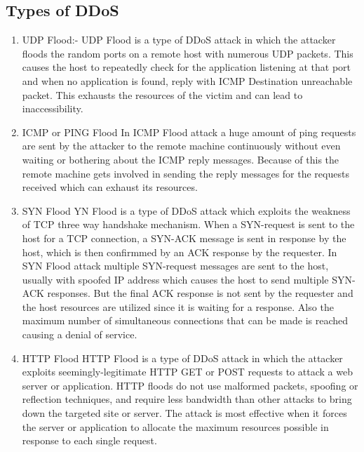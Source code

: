 \documentclass[12pt,a4paper,final]{report}
\begin{document}
\subsection{Types of DDoS}
\begin{enumerate}
\item
UDP Flood:-
\newline
UDP Flood is a type of DDoS attack in which the attacker floods the random ports on a remote host with numerous UDP packets. This causes the host to repeatedly check for the application listening at that port and when no application is found, reply with ICMP 	Destination unreachable packet. This exhausts the resources of the victim and can lead to inaccessibility.

\item
ICMP or PING Flood
\newline
In ICMP Flood attack a huge amount of ping requests are sent by the attacker to the remote machine continuously without even waiting or bothering about the ICMP reply messages. Because of this the remote machine gets involved in sending the reply messages for the requests received which can exhaust its resources. 

\item
SYN Flood
\newline
YN Flood is a type of DDoS attack which exploits the weakness of TCP three way handshake mechanism. When a SYN-request is sent to the host for a  TCP connection, a SYN-ACK message is sent in response  by the host, which is then confirmmed by an ACK response by the requester. In SYN Flood attack multiple SYN-request messages are sent to the host, usually with spoofed IP address which causes the host to send multiple SYN-ACK responses. But the final ACK response is not sent by the requester and the host resources are utilized since it is waiting for a response. Also the maximum number of simultaneous connections that can be made is reached causing a denial of service.

\item
HTTP Flood
\newline
HTTP Flood is a type of DDoS attack in which the attacker exploits seemingly-legitimate HTTP GET or POST requests to attack a web server or application. HTTP floods do not use malformed packets, spoofing or reflection techniques, and require less bandwidth than other attacks to bring down the targeted site or server. The attack is most effective when it forces the server or application to allocate the maximum resources possible in response to each single request.
\end{enumerate}
\end{document}

